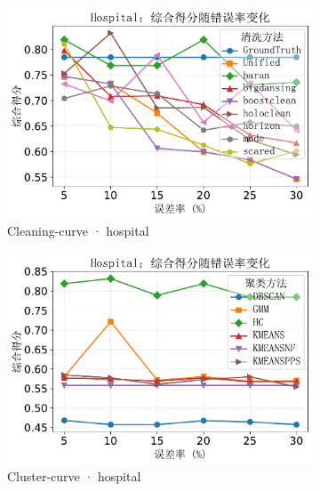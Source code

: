 \documentclass[10pt]{article} %
\numberwithin{equation}{section}
\begin{document}
\begin{figure}[htbp]
  \vspace{0.6em}
  \begin{subfigure}{0.35\linewidth}
    \centering
    \includegraphics[width=\linewidth]{figures/5.3.2graph/hospital_combined_score_cleaning.pdf}
    \caption{Cleaning-curve · hospital}
  \end{subfigure}\hfill
  \begin{subfigure}{0.35\linewidth}
    \centering
    \includegraphics[width=\linewidth]{figures/5.3.2graph/hospital_combined_score_cluster.pdf}
    \caption{Cluster-curve · hospital}
  \end{subfigure}\hfill
  \begin{subfigure}{0.295\linewidth}
    \centering

\end{subfigure}
\end{figure}
\end{document}
